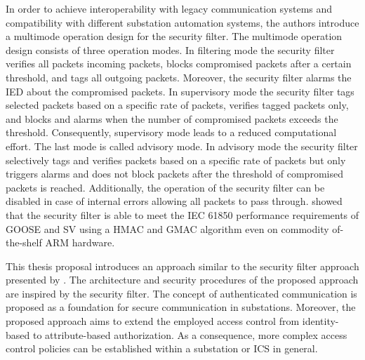 In order to achieve interoperability with legacy communication systems and compatibility with different substation automation systems, the authors introduce a multimode operation design for the security filter.
The multimode operation design consists of three operation modes.
In filtering mode the security filter verifies all packets incoming packets, blocks compromised packets after a certain threshold, and tags all outgoing packets.
Moreover, the security filter alarms the IED about the compromised packets.
In supervisory mode the security filter tags selected packets based on a specific rate of packets, verifies tagged packets only, and blocks and alarms when the number of compromised packets exceeds the threshold.
Consequently, supervisory mode leads to a reduced computational effort.
The last mode is called advisory mode.
In advisory mode the security filter selectively tags and verifies packets based on a specific rate of packets but only triggers alarms and does not block packets after the threshold of compromised packets is reached.
Additionally, the operation of the security filter can be disabled in case of internal errors allowing all packets to pass through.
\citeauthor{Ishchenko2018} showed that the security filter is able to meet the IEC 61850 performance requirements of GOOSE and SV \cite{IEC61850P5} using a HMAC and GMAC algorithm even on commodity of-the-shelf ARM hardware.

This thesis proposal introduces an approach similar to the security filter approach presented by \citeauthor{Ishchenko2018}.
The architecture and security procedures of the proposed approach are inspired by the security filter.
The concept of authenticated communication is proposed as a foundation for secure communication in substations.
Moreover, the proposed approach aims to extend the employed access control from identity-based to attribute-based authorization.
As a consequence, more complex access control policies can be established within a substation or ICS in general.

